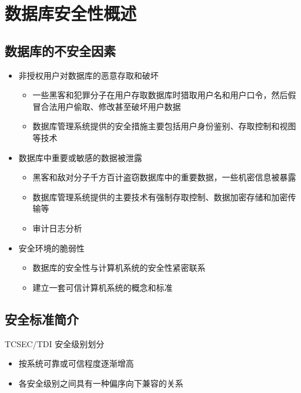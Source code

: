 \section{数据库安全性概述}

\subsection{数据库的不安全因素}
\begin{itemize}
    \item 非授权用户对数据库的恶意存取和破坏
    \begin{itemize}
        \item 一些黑客和犯罪分子在用户存取数据库时猎取用户名和用户口令，然后假冒合法用户偷取、修改甚至破坏用户数据
        \item 数据库管理系统提供的安全措施主要包括用户身份鉴别、存取控制和视图等技术
    \end{itemize}
    \item 数据库中重要或敏感的数据被泄露
    \begin{itemize}
        \item 黑客和敌对分子千方百计盗窃数据库中的重要数据，一些机密信息被暴露
        \item 数据库管理系统提供的主要技术有强制存取控制、数据加密存储和加密传输等
        \item 审计日志分析
    \end{itemize}
    \item 安全环境的脆弱性
    \begin{itemize}
        \item 数据库的安全性与计算机系统的安全性紧密联系
        \item 建立一套可信计算机系统的概念和标准
    \end{itemize}
\end{itemize}

\subsection{安全标准简介}
TCSEC/TDI 安全级别划分
\begin{itemize}
    \item 按系统可靠或可信程度逐渐增高
    \item 各安全级别之间具有一种偏序向下兼容的关系
\end{itemize}

